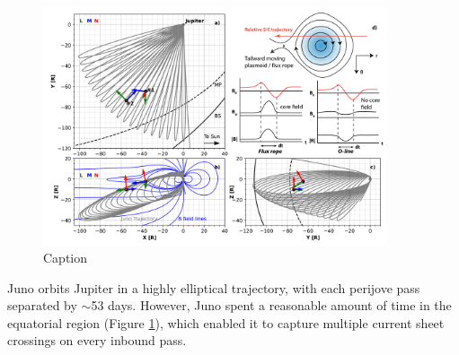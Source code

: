 \begin{figure}
    \centering
    \includegraphics[width=0.9\textwidth]{images5/locations-fluxropes.jpg}
    \caption{Caption}
    \label{fig:locations-fluxropes-eg}
\end{figure}

Juno orbits Jupiter in a highly elliptical trajectory, with each perijove pass separated by $\sim$53 days. However, Juno spent a reasonable amount of time in the equatorial region (Figure \ref{fig:locations-fluxropes-eg}), which enabled it to capture multiple current sheet crossings on every inbound pass. 


